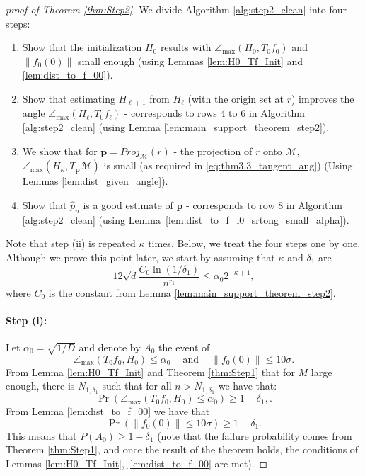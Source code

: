 \documentclass[12pt]{article}
\theoremstyle{remark}
\newcommand{\MM}{\mathcal{M}}
\newcommand{\maxangle}{\angle_{\max}}
\begin{document}
\begin{proof}[proof of Theorem \ref{thm:Step2}]
	We divide Algorithm \ref{alg:step2_clean} into four steps:
	\begin{enumerate}
		\item[(i)] Show that the initialization $H_0 $ results with $\maxangle(H_0, T_{0} f_0)$ and $\|f_0(0)\|$ small enough (using Lemmas \ref{lem:H0_Tf_Init} and \ref{lem:dist_to_f_00}).
		\item[(ii)] Show that estimating $H_{\ell+1}$ from $H_{\ell}$ (with the origin set at $r$) improves the angle  $\maxangle(H_\ell, T_{0} f_\ell)$ - corresponds to rows 4 to 6 in Algorithm \ref{alg:step2_clean} (using Lemma \ref{lem:main_support_theorem_step2}).
		\item[(iii)] We show that for $\mathrm{\mathbf{p}} = Proj_\MM(r)$ - the projection of $r$ onto $\MM$, $\maxangle(H_\kappa, T_{\mathrm{\mathbf{p}}}\MM)$  is small (as required in \eqref{eq:thm3.3_tangent_ang}) (Using Lemmas \ref{lem:dist_given_angle}).
		\item[(iv)] Show that $\hat p_n$  is a good estimate of  $\mathrm{\mathbf{p}}$ - corresponds to row 8 in Algorithm \ref{alg:step2_clean} (using Lemma~\ref{lem:dist_to_f_l0_srtong_small_alpha}).
	\end{enumerate}
	Note that step (ii) is repeated $\kappa$ times.
	Below, we treat the four steps one by one. 
	Although we prove this point later, we start by assuming that $\kappa$ and $\delta_1$ are
	\begin{equation}\label{eq:n_bound1}
		12\sqrt{d}\frac{C_0 \ln(1/\delta_1)}{n^{r_1}} \leq \alpha_0 2^{-\kappa+1},
	\end{equation}
	where $C_0$ is the constant from Lemma \ref{lem:main_support_theorem_step2}. 
	
	\paragraph*{Step (i):}
	Let $\alpha_0=\sqrt{1/D}$ and denote by $A_0$ the event of
	\[
	\maxangle (T_0f_{0}, H_{0}) \leq \alpha_0 
	~~~~\mbox{ and } ~~~~
	\|f_0(0)\| \leq 10\sigma 
	.\]
	From Lemma \ref{lem:H0_Tf_Init} and Theorem \ref{thm:Step1} that for $M$ large enough, there is $N_{1,\delta_1}$ such that for all $n>N_{1,\delta_1}$ we have that:
	\[
	\Pr\left(\maxangle (T_0f_{0}, H_{0}) \leq \alpha_0 \right) \geq 1-\delta_1,
	.\]
	From Lemma \ref{lem:dist_to_f_00} we have that
	\[
	\Pr\left(\|f_0(0)\| \leq 10\sigma \right) \geq 1-\delta_1.
	\]
	This means that $P(A_0) \geq 1-\delta_1$ (note that the failure probability comes from Theorem \ref{thm:Step1}, and once the result of the theorem holds, the conditions of Lemmas \ref{lem:H0_Tf_Init}, \ref{lem:dist_to_f_00} are met).


\end{proof}
\end{document}
